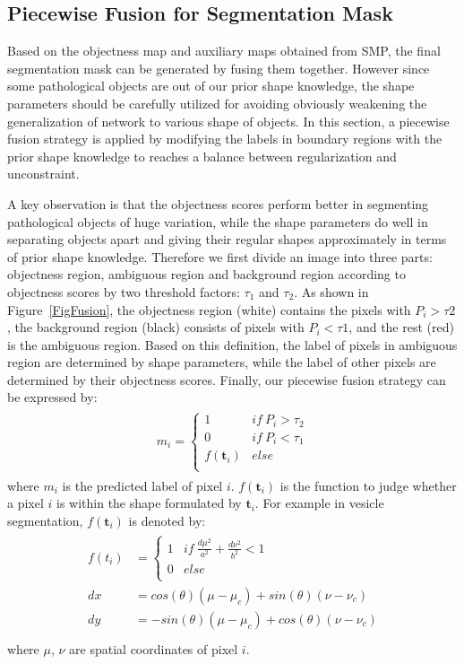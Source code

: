 \subsection{Piecewise Fusion for Segmentation Mask}
\label{sec:fusion}
Based on the objectness map and auxiliary maps obtained from SMP, the final segmentation mask can be generated by fusing them together.
However since some pathological objects are out of our prior shape knowledge, the shape parameters should be carefully utilized for avoiding obviously weakening the generalization of network to various shape of objects.
In this section, a piecewise fusion strategy is applied by modifying the labels in boundary regions with the prior shape knowledge to reaches a balance between regularization and unconstraint.

A key observation is that the objectness scores perform better in segmenting pathological objects of huge variation, while the shape parameters do well in separating objects apart and giving their regular shapes approximately in terms of prior shape knowledge.
Therefore we first divide an image into three parts: objectness region, ambiguous region and background region according to objectness scores by two threshold factors: $\tau_1$ and $\tau_2$.
As shown in Figure~\ref{FigFusion}, the objectness region (white) contains the pixels with $P_i>\tau2$, the background region (black) consists of pixels with $P_i<\tau1$, and the rest (red) is the ambiguous region.
Based on this definition, the label of pixels in ambiguous region are determined by shape parameters, while the label of other pixels are determined by their objectness scores.
Finally, our piecewise fusion strategy can be expressed by:
\begin{eqnarray}\label{fusion}
\begin{aligned}
m_i=\left\{\begin{array}{cc}
1&if~P_i>\tau_2\\
0&if~P_i<\tau_1\\
f(\mathbf{t}_i)&else\\
\end{array}\right.
\end{aligned}
\end{eqnarray}
where $m_i$ is the predicted label of pixel $i$.
$f(\mathbf{t}_i)$ is the function to judge whether a pixel $i$ is within the shape formulated by $\mathbf{t}_i$.
For example in vesicle segmentation, $f(\mathbf{t}_i)$ is denoted by:
\begin{eqnarray}\label{fusion1}
\begin{aligned}
f(t_i)&=\left\{\begin{array}{cc}
1&if~\frac{d\mu^2}{a^2}+\frac{d\nu^2}{b^2}<1\\
0&else\\
\end{array}\right.\\
dx &= cos(\theta)(\mu-\mu_c)+sin(\theta)(\nu-\nu_c)\\
dy &= -sin(\theta)(\mu-\mu_c)+cos(\theta)(\nu-\nu_c)\\
\end{aligned}
\end{eqnarray}
where $\mu$, $\nu$ are spatial coordinates of pixel $i$.

